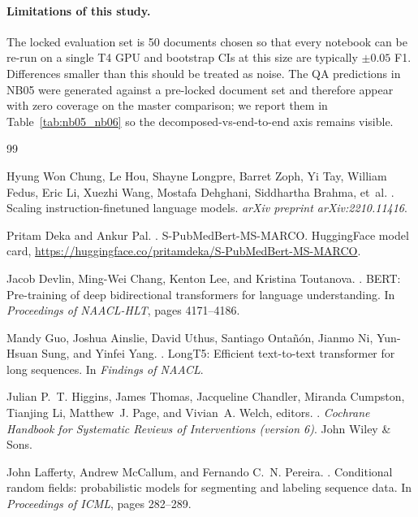 \documentclass[11pt]{article}
\begin{document}
\label{sec:limitations}
\paragraph{Limitations of this study.} The locked evaluation set is 50
documents chosen so that every notebook can be re-run on a single
T4 GPU  and bootstrap CIs at this size are typically $\pm 0.05$ F1.
Differences smaller than this should be treated as noise. The QA
predictions in NB05 were generated against a pre-locked document set
and therefore appear with zero coverage on the master comparison; we
report them in Table~\ref{tab:nb05_nb06} so the
decomposed-vs-end-to-end axis remains visible.




\begin{thebibliography}{99}

Hyung Won Chung, Le Hou, Shayne Longpre, Barret Zoph, Yi Tay,
William Fedus, Eric Li, Xuezhi Wang, Mostafa Dehghani, Siddhartha
Brahma, et~al.
.
\newblock Scaling instruction-finetuned language models.
\newblock \emph{arXiv preprint arXiv:2210.11416}.

Pritam Deka and Ankur Pal.
.
\newblock S-PubMedBert-MS-MARCO.
\newblock HuggingFace model card,
\newblock \url{https://huggingface.co/pritamdeka/S-PubMedBert-MS-MARCO}.

Jacob Devlin, Ming-Wei Chang, Kenton Lee, and Kristina Toutanova.
.
\newblock BERT: Pre-training of deep bidirectional transformers for
language understanding.
\newblock In \emph{Proceedings of NAACL-HLT}, pages 4171--4186.

Mandy Guo, Joshua Ainslie, David Uthus, Santiago Onta\~n\'on,
Jianmo Ni, Yun-Hsuan Sung, and Yinfei Yang.
.
\newblock LongT5: Efficient text-to-text transformer for long sequences.
\newblock In \emph{Findings of NAACL}.

Julian P.~T. Higgins, James Thomas, Jacqueline Chandler, Miranda
Cumpston, Tianjing Li, Matthew~J. Page, and Vivian~A. Welch, editors.
.
\newblock \emph{Cochrane Handbook for Systematic Reviews of
Interventions (version 6)}.
\newblock John Wiley \& Sons.

John Lafferty, Andrew McCallum, and Fernando C.~N. Pereira.
.
\newblock Conditional random fields: probabilistic models for
segmenting and labeling sequence data.
\newblock In \emph{Proceedings of ICML}, pages 282--289.


\end{thebibliography}
\end{document}
